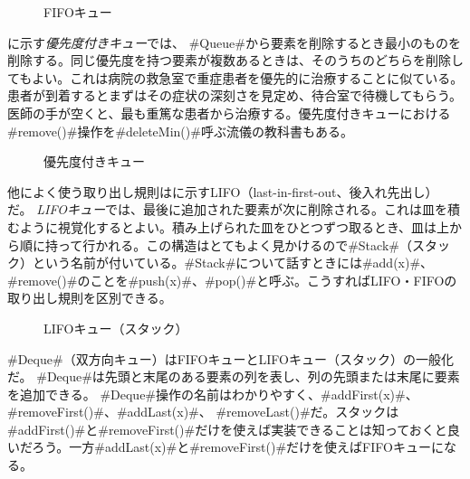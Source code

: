 \begin{figure}
  \caption{FIFOキュー}
\end{figure}

に示す\emph{優先度付きキュー}では、
%
%
%
#Queue#から要素を削除するとき最小のものを削除する。同じ優先度を持つ要素が複数あるときは、そのうちのどちらを削除してもよい。これは病院の救急室で重症患者を優先的に治療することに似ている。患者が到着するとまずはその症状の深刻さを見定め、待合室で待機してもらう。医師の手が空くと、最も重篤な患者から治療する。優先度付きキューにおける#remove()#操作を#deleteMin()#呼ぶ流儀の教科書もある。 %

\begin{figure}
  \caption{優先度付きキュー}
\end{figure}

他によく使う取り出し規則はに示すLIFO（last-in-first-out、後入れ先出し）
%
%
%
%
だ。 \emph{LIFOキュー}では、最後に追加された要素が次に削除される。これは皿を積むように視覚化するとよい。積み上げられた皿をひとつずつ取るとき、皿は上から順に持って行かれる。この構造はとてもよく見かけるので#Stack#（スタック）という名前が付いている。#Stack#について話すときには#add(x)#、#remove()#のことを#push(x)#、#pop()#と呼ぶ。こうすればLIFO・FIFOの取り出し規則を区別できる。

\begin{figure}
  \caption{LIFOキュー（スタック）}
\end{figure}

#Deque#（双方向キュー）はFIFOキューとLIFOキュー（スタック）の一般化だ。 #Deque#は先頭と末尾のある要素の列を表し、列の先頭または末尾に要素を追加できる。 #Deque#操作の名前はわかりやすく、#addFirst(x)#、#removeFirst()#、#addLast(x)#、 #removeLast()#だ。スタックは#addFirst()#と#removeFirst()#だけを使えば実装できることは知っておくと良いだろう。一方#addLast(x)#と#removeFirst()#だけを使えばFIFOキューになる。 %

